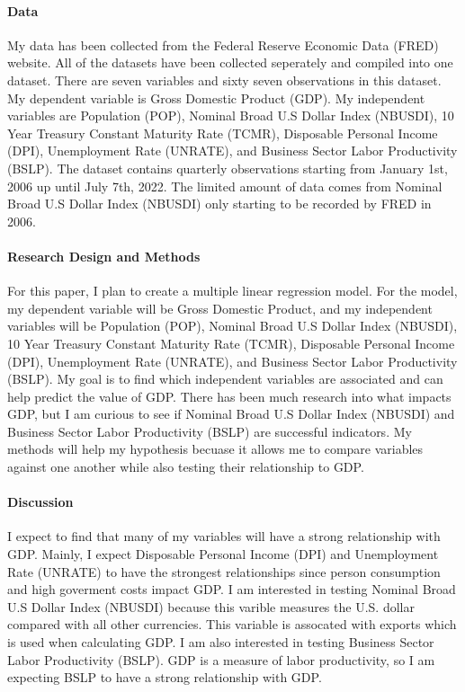 \documentclass[12pt]{article}
\begin{document}
\paragraph{Data}
My data has been collected from the Federal Reserve Economic Data (FRED) website.
All of the datasets have been collected seperately and compiled into one dataset. 
There are seven variables and sixty seven observations in this dataset. 
My dependent variable is Gross Domestic Product (GDP). 
My independent variables are Population (POP), Nominal Broad U.S Dollar Index (NBUSDI), 10 Year Treasury Constant Maturity Rate (TCMR), Disposable Personal Income (DPI), Unemployment Rate (UNRATE), and Business Sector Labor Productivity (BSLP). 
The dataset contains quarterly observations starting from January 1st, 2006 up until July 7th, 2022.
The limited amount of data comes from Nominal Broad U.S Dollar Index (NBUSDI) only starting to be recorded by FRED in 2006. 




\paragraph{Research Design and Methods}
For this paper, I plan to create a multiple linear regression model. 
For the model, my dependent variable will be Gross Domestic Product, and my independent variables will be Population (POP), Nominal Broad U.S Dollar Index (NBUSDI), 10 Year Treasury Constant Maturity Rate (TCMR), Disposable Personal Income (DPI), Unemployment Rate (UNRATE), and Business Sector Labor Productivity (BSLP). 
My goal is to find which independent variables are associated and can help predict the value of GDP. 
There has been much research into what impacts GDP, but I am curious to see if Nominal Broad U.S Dollar Index (NBUSDI) and  Business Sector Labor Productivity (BSLP) are successful indicators. 
My methods will help my hypothesis becuase it allows me to compare variables against one another while also testing their relationship to GDP.


\paragraph{Discussion}
I expect to find that many of my variables will have a strong relationship with GDP.
Mainly, I expect Disposable Personal Income (DPI) and Unemployment Rate (UNRATE) to have the strongest relationships since person consumption and high goverment costs impact GDP.
I am interested in testing Nominal Broad U.S Dollar Index (NBUSDI) because this varible measures the U.S. dollar compared with all other currencies. 
This variable is assocated with exports which is used when calculating GDP.
I am also interested in testing Business Sector Labor Productivity (BSLP). GDP is a measure of labor productivity, so I am expecting BSLP to have a strong relationship with GDP. 
\end{document}
